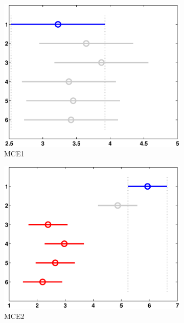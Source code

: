 \begin{figure}
	\centering
	\begin{subfigure}[b]{0.49\linewidth}
		\includegraphics[width=\linewidth]{Figures/B-Bonferroni_HNMED_VS_ED1}
		\caption{MCE1} \label{fig:Bon_M1} 
	\end{subfigure}
	\begin{subfigure}[b]{0.49\linewidth}
		\includegraphics[width=\textwidth]{Figures/B-Bonferroni_HNMED_VS_ED2}
		\caption{MCE2} \label{fig:Bon_M2} 
	\end{subfigure}
	\begin{subfigure}[b]{0.49\linewidth}

\end{subfigure}
\end{figure}
